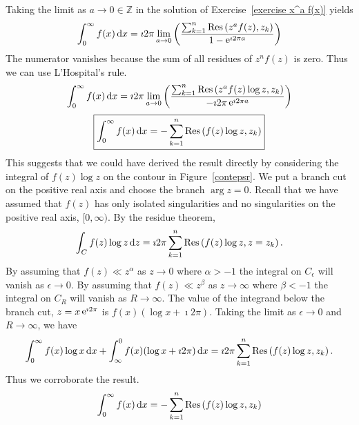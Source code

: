 {%
\begin{Solution}
  \label{solution intzi f(x)}
  Taking the limit as $a \to 0 \in \mathbb{Z}$ in the
  solution of Exercise~\ref{exercise x^a f(x)} yields
  \[
  \int_0^\infty f(x) \,\mathrm{d} x
  = \imath 2 \pi \lim_{a \to 0} \left( 
    \frac{ \sum_{k=1}^n \mathop{\mathrm{Res}}\nolimits \left( z^a f(z), z_k \right) }
    { 1 - \mathop{\mathrm{e}}\nolimits^{\imath 2 \pi a} } \right)
  \]
  The numerator vanishes because the sum of all residues of $z^n f(z)$ is zero.
  Thus we can use L'Hospital's rule.
  \[
  \int_0^\infty f(x) \,\mathrm{d} x
  = \imath 2 \pi \lim_{a \to 0} \left( 
    \frac{ \sum_{k=1}^n \mathop{\mathrm{Res}}\nolimits \left( z^a f(z) \log z, z_k \right) }
    { - \imath 2 \pi \mathop{\mathrm{e}}\nolimits^{\imath 2 \pi a} } \right)
  \]
  \[
  \boxed{
    \int_0^\infty f(x) \,\mathrm{d} x
    = - \sum_{k=1}^n \mathop{\mathrm{Res}}\nolimits \left( f(z) \log z, z_k \right) 
    }
  \]
  This suggests that we could have derived the result directly by considering
  the integral of $f(z) \log z$ on the contour in Figure~\ref{contepsr}.
  We put a branch cut on the positive real axis and choose the branch
  $\arg z = 0$.  Recall that we have assumed that $f(z)$ has only isolated 
  singularities and no singularities on the positive real axis, $[0,\infty)$.  
  By the residue theorem,
  \[
  \int_C f(z) \log z \,\mathrm{d} z = \imath 2 \pi \sum_{k=1}^n \mathop{\mathrm{Res}}\nolimits \left( f(z) \log z,
    z = z_k \right).
  \]
  By assuming that $f(z) \ll z^\alpha$ as $z \to 0$ where $\alpha > -1$ the 
  integral on $C_\epsilon$ will vanish as $\epsilon \to 0$.  By assuming that
  $f(z) \ll z^\beta$ as $z \to \infty$ where $\beta < -1$ the integral on
  $C_R$ will vanish as $R \to \infty$.  
  The value of the integrand below the branch cut, $z = x \mathop{\mathrm{e}}\nolimits^{\imath 2 \pi}$ is
  $f(x) (\log x + \imath 2 \pi)$.
  Taking the limit as $\epsilon \to 0$ and $R \to \infty$, we have
  \[
  \int_0^\infty f(x) \log x \,\mathrm{d} x + \int_{\infty}^0 f(x) (\log x + \imath 2 \pi) \,\mathrm{d} x
  = \imath 2 \pi \sum_{k=1}^n \mathop{\mathrm{Res}}\nolimits \left( f(z) \log z, z_k \right).
  \]
  Thus we corroborate the result.
  \[
  \int_0^\infty f(x) \,\mathrm{d} x
  = - \sum_{k=1}^n \mathop{\mathrm{Res}}\nolimits \left( f(z) \log z, z_k \right) 
  \]
\end{Solution}



}
